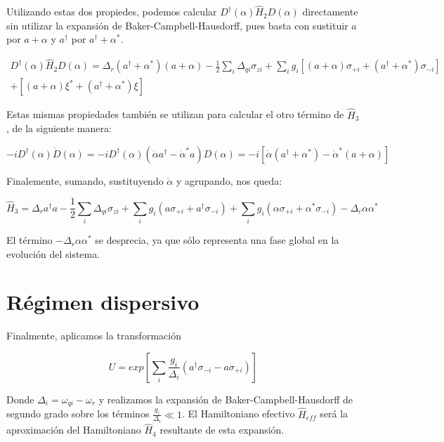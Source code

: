 Utilizando estas dos propiedes, podemos calcular $D^\dagger(\alpha) \hat{H}_2 D(\alpha)$ directamente sin utilizar la expansión de Baker-Campbell-Hausdorff, pues basta con sustituir $a$ por $a+\alpha$ y $a^\dagger$ por $a^\dagger+\alpha^*$.

\begin{multline}
  D^\dagger(\alpha) \hat{H}_2 D(\alpha) = \Delta_r (a^\dagger + \alpha^*) (a + \alpha) - \frac{1}{2} \sum\limits_i \Delta_{qi} \sigma_{zi} + \sum\limits_i g_i [(a+\alpha) \sigma_{+ i} + (a^\dagger+\alpha^*) \sigma_{- i}] \\
  + [(a+\alpha)\xi^*+(a^\dagger+\alpha^*)\xi]
\end{multline}

Estas mismas propiedades también se utilizan para calcular el otro término de $\hat{H}_3$, de la siguiente manera:

\begin{equation}
    -i D^\dagger(\alpha) \dot{D}(\alpha) = -i D^\dagger(\alpha) (\dot{\alpha} a^\dagger - \dot{\alpha}^* a) D(\alpha) = -i[\dot{\alpha} (a^\dagger + \alpha^*) - \dot{\alpha}^* (a + \alpha)]
\end{equation}

Finalemente, sumando, sustituyendo $\dot{\alpha}$ y agrupando, nos queda:

\begin{equation}
    \hat{H}_3 = \Delta_r a^\dagger a - \frac{1}{2} \sum\limits_i \Delta_{qi} \sigma_{zi} + \sum\limits_i g_i (a \sigma_{+i} + a^\dagger \sigma_{-i}) + \sum\limits_i g_i (\alpha \sigma_{+i} + \alpha^* \sigma_{-i}) - \Delta_c \alpha \alpha^*
\end{equation}

El término $-\Delta_r \alpha \alpha^*$ se desprecia, ya que sólo representa una fase global en la evolución del sistema.

\section{Régimen dispersivo}

Finalmente, aplicamos la transformación

\begin{equation}
    U = exp[\sum\limits_i \frac{g_i} {\Delta_i} (a^\dagger \sigma_{-i} - a \sigma_{+i})]
\end{equation}

Donde $\Delta_i = \omega_{qi} - \omega_r$ y realizamos la expansión de Baker-Campbell-Hausdorff de segundo grado sobre los términos $\frac{g_i}{\Delta_i} \ll 1$. El Hamiltoniano efectivo $\hat{H}_{eff}$ será la aproximación del Hamiltoniano $\hat{H}_4$ resultante de esta expansión.

